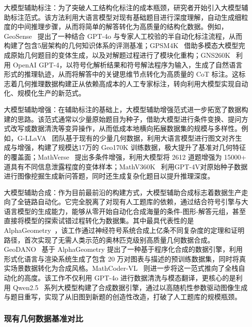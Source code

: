 大模型辅助标注：为了突破人工结构化标注的成本瓶颈，研究者开始引入大模型辅助标注范式。该方法利用大语言模型对现有基础题目进行深度理解，自动生成细粒度的中间推理步骤，从而将简单的解答转化为高质量的结构化数据。例如，GeoSense~\cite{xu2025geosense} 提出了一种结合 GPT-4o 与专家人工校验的半自动化标注流程，从而构建了包含5层架构的几何知识体系的评测基准；GPSM4K~\cite{jaiswal2024gpsm4k} 借助多模态大模型完成原始几何题目的变体生成，以及对解题过程进行了模块化重构；GNS260K~\cite{ning2025gns} 利用 OpenAI GPT-4，以符号化解析结果和符号解法程序为输入，生成了自然语言形式的推理轨迹，从而将解答中的关键思维节点转化为高质量的 CoT 标注。这标志着几何推理数据构建正从依赖高成本的人工专家标注，转向利用大模型实现自动化、规模化生产的新范式。

大模型辅助增强：在辅助标注的基础上，大模型辅助增强范式进一步拓宽了数据构建的思路。该范式通常以少量原始题目为种子，借助大模型进行条件变换、提问方式改写或数据清洗等变异操作，从而低成本地横向拓展数据集的规模与多样性。例如，G-LLaVA~\cite{gao2023gllava} 团队基于现有的少量几何数据，利用大语言模型进行图文对齐生成与增强，构建了规模达17万的 Geo170K 训练数据，极大提升了基准对几何特征的覆盖面；MathVerse~\cite{zhang2024mathverse} 提出多条件增强，利用大模型将 2612 道题增强为 15000+ 道具有不同信息泄露程度的变体样本；MathV360K~\cite{shi2024mathllava} 利用GPT-4V对原始种子数据进行图像挖掘生成新问答题，同时还生成复杂化题目以提升推理深度。

大模型辅助合成：作为目前最前沿的构建方式，大模型辅助合成标志着数据生产走向了全链路自动化。它完全脱离了对现有人工题库的依赖，通过结合符号引擎与大语言模型的生成能力，能够从零开始自动化合成海量的条件-图形-解答元组，甚至直接将模型的探索试错过程转化为数据集。其中最具代表性的是 AlphaGeometry~\cite{trinh2024alphageometry}，该工作通过神经符号系统合成上亿条不同复杂度的定理和证明路径，首次实现了无需人类示范的奥林匹克级别高质量几何数据合成。GeoDANO~\cite{cho2025geodano} 基于 AlphaGeometry 提出了一种基于程序化合成的数据引擎，利用形式化语言与渲染系统生成了包含 20 万对图表与描述的预训练数据集，同时将真实场景数据转化为合成风格。MathCoder-VL~\cite{wang2025mathcodervl} 则进一步将这一范式推向了全栈自动化的高度。该工作不仅利用 GPT-4o 进行数据清洗与模态翻译，更核心的是利用 Qwen2.5~\cite{qwen25} 系列大模型构建了合成数据引擎，通过以高随机性参数驱动图像生成与题目重写，实现了从旧图到新题的创造性改造，打破了人工题库的规模瓶颈。

\subsubsection{现有几何数据基准对比}

